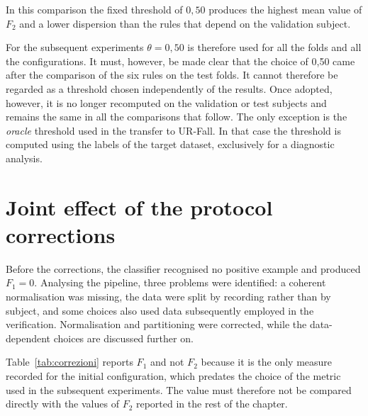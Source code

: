 In this comparison the fixed threshold of $0{,}50$ produces the highest mean value of $F_2$ and a lower dispersion than the rules that depend on the validation subject.

For the subsequent experiments $\theta=0{,}50$ is therefore used for all the folds and all the configurations. It must, however, be made clear that the choice of 0,50 came after the comparison of the six rules on the test folds. It cannot therefore be regarded as a threshold chosen independently of the results. Once adopted, however, it is no longer recomputed on the validation or test subjects and remains the same in all the comparisons that follow.
The only exception is the \emph{oracle} threshold used in the transfer to UR-Fall. In that case the threshold is computed using the labels of the target dataset, exclusively for a diagnostic analysis.

\section{Joint effect of the protocol corrections}
\label{sec:baseline}

Before the corrections, the classifier recognised no positive example and produced $F_1=0$. Analysing the pipeline, three problems were identified: a coherent normalisation was missing, the data were split by recording rather than by subject, and some choices also used data subsequently employed in the verification. Normalisation and partitioning were corrected, while the data-dependent choices are discussed further on.

\begin{table}[ht]
\centering
\caption{Joint effect of the main corrections introduced in the protocol.}
\label{tab:correzioni}
\end{table}

Table~\ref{tab:correzioni} reports $F_1$ and not $F_2$ because it is the only measure recorded for the initial configuration, which predates the choice of the metric used in the subsequent experiments. The value must therefore not be compared directly with the values of $F_2$ reported in the rest of the chapter.

